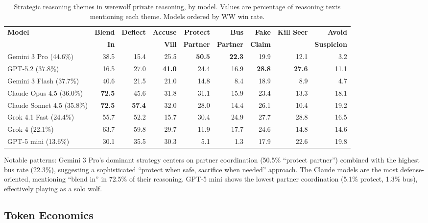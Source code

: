 \begin{table}[ht]
\caption{Strategic reasoning themes in werewolf private reasoning, by model. Values are percentage of reasoning texts mentioning each theme. Models ordered by WW win rate.}
\label{tab:reasoning_themes}
\centering
\scriptsize
\begin{tabular}{lrrrrrrrr}
\toprule
\textbf{Model} & \textbf{Blend} & \textbf{Deflect} & \textbf{Accuse} & \textbf{Protect} & \textbf{Bus} & \textbf{Fake} & \textbf{Kill Seer} & \textbf{Avoid} \\
 & \textbf{In} & & \textbf{Vill} & \textbf{Partner} & \textbf{Partner} & \textbf{Claim} & & \textbf{Suspicion} \\
\midrule
Gemini 3 Pro (44.6\%)    & 38.5 & 15.4 & 25.5 & \textbf{50.5} & \textbf{22.3} & 19.9 & 12.1 &  3.2 \\
GPT-5.2 (37.8\%)         & 16.5 & 27.0 & \textbf{41.0} & 24.4 & 16.9 & \textbf{28.8} & \textbf{27.6} & 11.1 \\
Gemini 3 Flash (37.7\%)  & 40.6 & 21.5 & 21.0 & 14.8 &  8.4 & 18.9 &  8.9 &  4.7 \\
Claude Opus 4.5 (36.0\%) & \textbf{72.5} & 45.6 & 31.8 & 31.1 & 15.9 & 23.4 & 13.3 & 18.1 \\
Claude Sonnet 4.5 (35.8\%) & \textbf{72.5} & \textbf{57.4} & 32.0 & 28.0 & 14.4 & 26.1 & 10.4 & 19.2 \\
Grok 4.1 Fast (24.4\%)   & 55.7 & 52.2 & 15.7 & 30.4 & 24.9 & 27.7 & 28.8 & 16.5 \\
Grok 4 (22.1\%)          & 63.7 & 59.8 & 29.7 & 11.9 & 17.7 & 24.6 & 14.8 & 14.6 \\
GPT-5 mini (13.6\%)      & 30.1 & 35.5 & 30.3 &  5.1 &  1.3 & 17.9 & 22.6 & 19.8 \\
\bottomrule
\end{tabular}
\end{table}

Notable patterns: Gemini 3 Pro's dominant strategy centers on partner coordination (50.5\% ``protect partner'') combined with the highest bus rate (22.3\%), suggesting a sophisticated ``protect when safe, sacrifice when needed'' approach. The Claude models are the most defense-oriented, mentioning ``blend in'' in 72.5\% of their reasoning. GPT-5 mini shows the lowest partner coordination (5.1\% protect, 1.3\% bus), effectively playing as a solo wolf.


\subsection{Token Economics}
\label{app:tokens}

